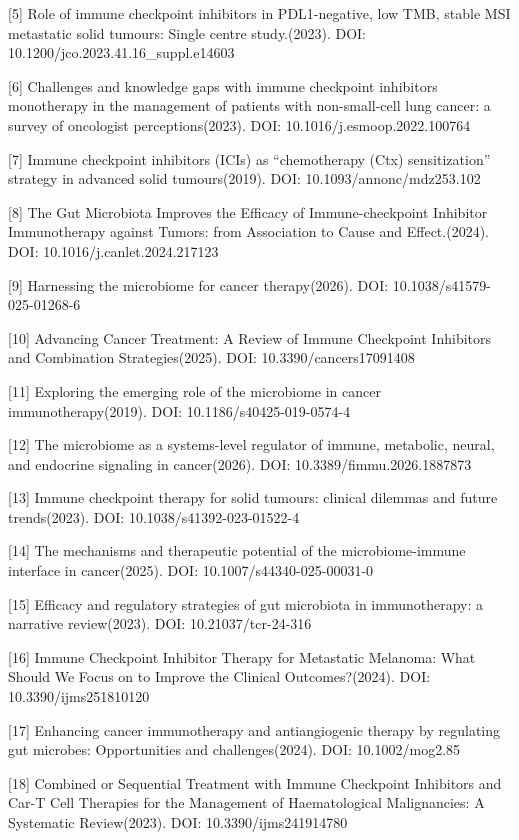 \documentclass[11pt]{article}
\begin{document}
{[}5{]} Role of immune checkpoint inhibitors in PDL1-negative, low TMB, stable MSI metastatic solid tumours: Single centre study.(2023). DOI: 10.1200/jco.2023.41.16\_suppl.e14603

{[}6{]} Challenges and knowledge gaps with immune checkpoint inhibitors monotherapy in the management of patients with non-small-cell lung cancer: a survey of oncologist perceptions(2023). DOI: 10.1016/j.esmoop.2022.100764

{[}7{]} Immune checkpoint inhibitors (ICIs) as ``chemotherapy (Ctx) sensitization'' strategy in advanced solid tumours(2019). DOI: 10.1093/annonc/mdz253.102

{[}8{]} The Gut Microbiota Improves the Efficacy of Immune-checkpoint Inhibitor Immunotherapy against Tumors: from Association to Cause and Effect.(2024). DOI: 10.1016/j.canlet.2024.217123

{[}9{]} Harnessing the microbiome for cancer therapy(2026). DOI: 10.1038/s41579-025-01268-6

{[}10{]} Advancing Cancer Treatment: A Review of Immune Checkpoint Inhibitors and Combination Strategies(2025). DOI: 10.3390/cancers17091408

{[}11{]} Exploring the emerging role of the microbiome in cancer immunotherapy(2019). DOI: 10.1186/s40425-019-0574-4

{[}12{]} The microbiome as a systems-level regulator of immune, metabolic, neural, and endocrine signaling in cancer(2026). DOI: 10.3389/fimmu.2026.1887873

{[}13{]} Immune checkpoint therapy for solid tumours: clinical dilemmas and future trends(2023). DOI: 10.1038/s41392-023-01522-4

{[}14{]} The mechanisms and therapeutic potential of the microbiome-immune interface in cancer(2025). DOI: 10.1007/s44340-025-00031-0

{[}15{]} Efficacy and regulatory strategies of gut microbiota in immunotherapy: a narrative review(2023). DOI: 10.21037/tcr-24-316

{[}16{]} Immune Checkpoint Inhibitor Therapy for Metastatic Melanoma: What Should We Focus on to Improve the Clinical Outcomes?(2024). DOI: 10.3390/ijms251810120

{[}17{]} Enhancing cancer immunotherapy and antiangiogenic therapy by regulating gut microbes: Opportunities and challenges(2024). DOI: 10.1002/mog2.85

{[}18{]} Combined or Sequential Treatment with Immune Checkpoint Inhibitors and Car-T Cell Therapies for the Management of Haematological Malignancies: A Systematic Review(2023). DOI: 10.3390/ijms241914780
\end{document}
